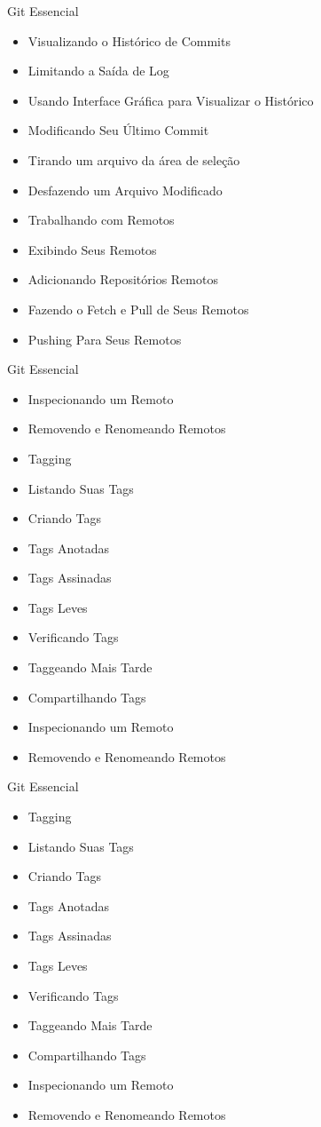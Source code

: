 \documentclass[t]{beamer}
\begin{document}
\begin{frame} {Git Essencial}
	\begin{itemize}
		\item Visualizando o Histórico de Commits
		\item Limitando a Saída de Log
		\item Usando Interface Gráfica para Visualizar o Histórico
		\item Modificando Seu Último Commit
		\item Tirando um arquivo da área de seleção
		\item Desfazendo um Arquivo Modificado
		\item Trabalhando com Remotos
		\item Exibindo Seus Remotos
		\item Adicionando Repositórios Remotos
		\item Fazendo o Fetch e Pull de Seus Remotos
		\item Pushing Para Seus Remotos
	\end{itemize}
\end{frame}

\begin{frame} {Git Essencial}
	\begin{itemize}
		\item Inspecionando um Remoto
		\item Removendo e Renomeando Remotos
		\item Tagging		
		\item Listando Suas Tags
		\item Criando Tags
		\item Tags Anotadas
		\item Tags Assinadas
		\item Tags Leves
		\item Verificando Tags
		\item Taggeando Mais Tarde
		\item Compartilhando Tags		
		\item Inspecionando um Remoto
		\item Removendo e Renomeando Remotos

	\end{itemize}
\end{frame}

\begin{frame} {Git Essencial}
	\begin{itemize}
		\item Tagging		
		\item Listando Suas Tags
		\item Criando Tags
		\item Tags Anotadas
		\item Tags Assinadas
		\item Tags Leves
		\item Verificando Tags
		\item Taggeando Mais Tarde
		\item Compartilhando Tags		
		\item Inspecionando um Remoto
		\item Removendo e Renomeando Remotos

	\end{itemize}
\end{frame}
\end{document}
